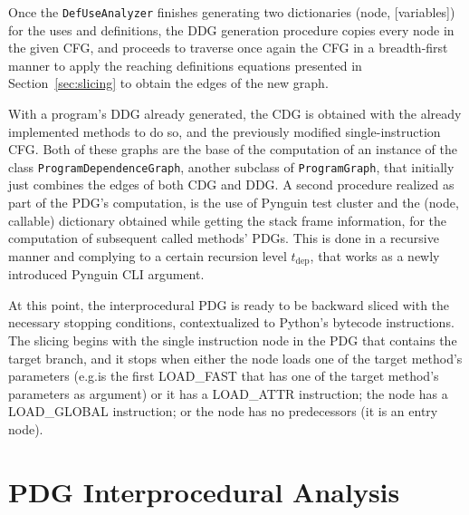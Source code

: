 \documentclass[%
  chapterprefix=false,%
  open=right,%
  twoside=true,%
  paper=a4,%
  logofile={Figures/logo.png},%
  thesistype=master,%
  UKenglish,%
]{se2thesis}
\newcommand{\classname}[1]{\texttt{#1}}
\begin{document}

Once the \classname{DefUseAnalyzer} finishes generating two dictionaries (node, [variables]) for the uses and definitions, the DDG generation procedure copies every node in the given CFG, and proceeds to traverse once again the CFG in a breadth-first manner to apply the reaching definitions equations presented in Section~\ref{sec:slicing} to obtain the edges of the new graph.

With a program's DDG already generated, the CDG is obtained with the already implemented methods to do so, and the previously modified single-instruction CFG.\@
Both of these graphs are the base of the computation of an instance of the class \classname{ProgramDependenceGraph}, another subclass of \classname{ProgramGraph}, that initially just combines the edges of both CDG and DDG.\@
A second procedure realized as part of the PDG's computation, is the use of Pynguin test cluster and the (node, callable) dictionary obtained while getting the stack frame information, for the computation of subsequent called methods' PDGs.
This is done in a recursive manner and complying to a certain recursion level \(t_{\text{dep}}\), that works as a newly introduced Pynguin CLI argument. 

At this point, the interprocedural PDG is ready to be backward sliced with the necessary stopping conditions, contextualized to Python's bytecode instructions.
The slicing begins with the single instruction node in the PDG that contains the target branch, and it stops when either the node loads one of the target method's parameters (e.g.\@it is the first LOAD\_FAST that has one of the target method's parameters as argument) or it has a LOAD\_ATTR instruction; the node has a LOAD\_GLOBAL instruction; or the node has no predecessors (it is an entry node).

\section{PDG Interprocedural Analysis}\label{sec:pdgia}
\end{document}
